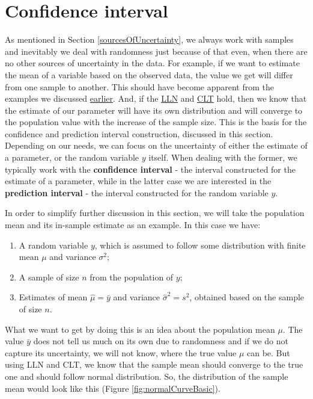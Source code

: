 \documentclass[
]{book}
\providecommand{\tightlist}{%
  \setlength{\itemsep}{0pt}\setlength{\parskip}{0pt}}
\theoremstyle{definition}
\theoremstyle{definition}
\theoremstyle{definition}
\theoremstyle{definition}
\theoremstyle{remark}
\begin{document}
\hypertarget{confidenceInterval}{%
\section{Confidence interval}\label{confidenceInterval}}

As mentioned in Section \ref{sourcesOfUncertainty}, we always work with samples and inevitably we deal with randomness just because of that even, when there are no other sources of uncertainty in the data. For example, if we want to estimate the mean of a variable based on the observed data, the value we get will differ from one sample to another. This should have become apparent from the examples we discussed \protect\hyperlink{estimatesProperties}{earlier}. And, if the \protect\hyperlink{LLN}{LLN} and \protect\hyperlink{CLT}{CLT} hold, then we know that the estimate of our parameter will have its own distribution and will converge to the population value with the increase of the sample size. This is the basis for the confidence and prediction interval construction, discussed in this section. Depending on our needs, we can focus on the uncertainty of either the estimate of a parameter, or the random variable \(y\) itself. When dealing with the former, we typically work with the \textbf{confidence interval} - the interval constructed for the estimate of a parameter, while in the latter case we are interested in the \textbf{prediction interval} - the interval constructed for the random variable \(y\).

In order to simplify further discussion in this section, we will take the population mean and its in-sample estimate as an example. In this case we have:

\begin{enumerate}
\def\labelenumi{\arabic{enumi}.}
\tightlist
\item
  A random variable \(y\), which is assumed to follow some distribution with finite mean \(\mu\) and variance \(\sigma^2\);
\item
  A sample of size \(n\) from the population of \(y\);
\item
  Estimates of mean \(\hat{\mu}=\bar{y}\) and variance \(\hat{\sigma}^2 = s^2\), obtained based on the sample of size \(n\).
\end{enumerate}

What we want to get by doing this is an idea about the population mean \(\mu\). The value \(\bar{y}\) does not tell us much on its own due to randomness and if we do not capture its uncertainty, we will not know, where the true value \(\mu\) can be. But using LLN and CLT, we know that the sample mean should converge to the true one and should follow normal distribution. So, the distribution of the sample mean would look like this (Figure \ref{fig:normalCurveBasic}).
\end{document}

